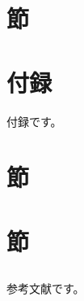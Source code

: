 \documentclass{jsarticle}
\begin{document}
\paragraph{}
\paragraph{}

\section{節}

\subsection{}
\subsection{}


\appendix
\section{付録}

付録です。

\section{節}

\subsection{}
\paragraph{}
\paragraph{}

\section{節}

\subsection{}
\subsection{}


\begin{thebibliography}{99}
参考文献です。



\end{thebibliography}
\end{document}
